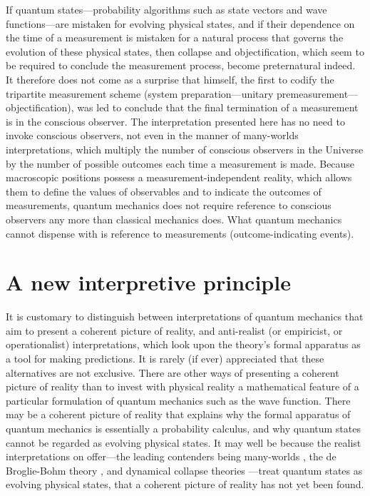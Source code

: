 If quantum states---probability algorithms such as state vectors and wave functions---are mistaken for evolving physical states, and if their dependence on the time of a measurement is mistaken for a natural process that governs the evolution of these physical states, then collapse and objectification, which seem to be required to conclude the measurement process, become preternatural indeed. It therefore does not come as a surprise that \citet{vonNeumann} himself, the first to codify the tripartite measurement scheme (system preparation---unitary premeasurement---objectification), was led to conclude that the final termination of a measurement is in the conscious observer. The interpretation presented here has no need to invoke conscious observers, not even in the manner of many-worlds interpretations, which multiply the number of conscious observers in the Universe by the number of possible outcomes each time a measurement is made. Because macroscopic positions possess a measurement-independent reality, which allows them to define the values of observables and to indicate the outcomes of measurements, quantum mechanics does not require reference to conscious observers any more than classical mechanics does. What quantum mechanics cannot dispense with is reference to measurements (outcome-indicating events).

\section{A new interpretive principle}\label{sec:newintpl}
It is customary to distinguish between interpretations of quantum mechanics that aim to present a coherent picture of reality, and anti-realist (or empiricist, or operationalist) interpretations, which look upon the theory's formal apparatus as a tool for making predictions. It is rarely (if ever) appreciated that these alternatives are not exclusive. There are other ways of presenting a coherent picture of reality than to invest with physical reality a mathematical feature of a particular formulation of quantum mechanics such as the wave function. There may be a coherent picture of reality that explains why the formal apparatus of quantum mechanics is essentially a probability calculus, and why quantum states cannot be regarded as evolving physical states. It may well be because the realist interpretations on offer---the leading contenders being many-worlds \citep{Barrett,Saundersetal}, the de Broglie-Bohm theory \citep{Bohm1952}, and dynamical collapse theories \citep{GRW,Pearle1989}---treat quantum states as evolving physical states, that a coherent picture of reality has not yet been found.

